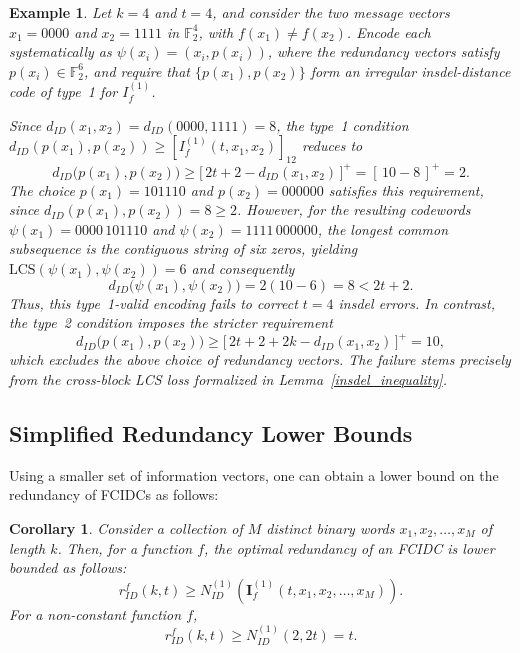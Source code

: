 \documentclass[11 pt]{article}
\numberwithin{equation}{section}
\newtheorem{corollary}[theorem]{Corollary}
\newtheorem{example}[theorem]{Example}
\begin{document}
    \begin{example}
    \label{ex:2k-essential}
    Let $k = 4$ and $t = 4$, and consider the two message vectors $x_1 = 0000$ and $x_2 = 1111$ in $\mathbb{F}_2^4$, with $f(x_1) \neq f(x_2)$. Encode each systematically as $\psi(x_i) = (x_i, p(x_i))$, where the redundancy vectors satisfy $p(x_i) \in \mathbb{F}_2^{6}$, and require that $\{p(x_1), p(x_2)\}$ form an irregular insdel-distance code of type~1 for $I^{(1)}_f$.

    Since $d_{ID}(x_1, x_2) = d_{ID}(0000, 1111) = 8$, the type~1 condition $d_{ID}(p(x_1), p(x_2)) \geq [I^{(1)}_f(t, x_1, x_2)]_{12}$ reduces to
    \[
    d_{ID}\big(p(x_1), p(x_2)\big) 
    \geq \big[\,2t + 2 - d_{ID}(x_1, x_2)\,\big]^{+} 
    = [\,10 - 8\,]^{+} = 2.
    \]
    The choice $p(x_1) = 101110$ and $p(x_2) = 000000$ satisfies this requirement, since $d_{ID}(p(x_1), p(x_2)) = 8 \geq 2$. However, for the resulting codewords $\psi(x_1) = 0000\,101110$ and $\psi(x_2) = 1111\,000000$, the longest common subsequence is the contiguous string of six zeros, yielding $\mathrm{LCS}(\psi(x_1), \psi(x_2)) = 6$ and consequently
    \[
    d_{ID}\big(\psi(x_1), \psi(x_2)\big) 
    = 2(10 - 6) = 8 < 2t + 2.
    \]
    Thus, this type~1-valid encoding fails to correct $t = 4$ insdel errors. In contrast, the type~2 condition imposes the stricter 
    requirement
    \[
    d_{ID}\big(p(x_1), p(x_2)\big) 
    \geq \big[\,2t + 2 + 2k - d_{ID}(x_1, x_2)\,\big]^{+} 
    = 10,
    \]
    which excludes the above choice of redundancy vectors. The failure stems precisely from the cross-block LCS loss formalized in Lemma~\ref{insdel_inequality}.
    \end{example}

 \subsection{Simplified Redundancy Lower Bounds} 
    Using a smaller set of  information vectors, one can obtain a lower bound on the redundancy of FCIDCs as follows:
    \begin{corollary}\label{lower_bound_red}
        Consider a collection of $M$ distinct binary words $x_1, x_2, \ldots, x_M$ of length $k$. Then, for a function $f$, the optimal redundancy of an FCIDC is lower bounded as follows:
        $$ r^f_{ID}(k, t) \geq N^{(1)}_{ID}(\boldsymbol{I}_f^{(1)}(t, x_1,x_2, \ldots,x_{M})).$$
        For a non-constant function $f$, 
        $$ r^f_{ID}(k, t) \geq N^{(1)}_{ID}(2, 2t) = t. $$
    \end{corollary}
\end{document}
